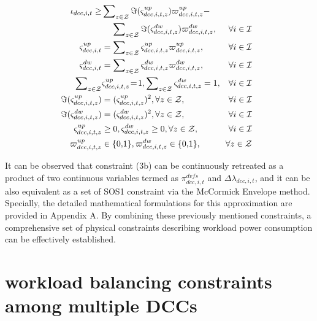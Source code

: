 \documentclass[lettersize,journal]{IEEEtran}
\begin{document}
\vspace{-0.25cm}
\begin{subequations}
\begin{align}
   \!\!\!\!\iota_{dcc,i,t} \geq & \sum\nolimits_{z\in\mathcal{Z}} \Im(\varsigma_{dcc,i,t, z}^{up}) \varpi_{dcc,i,t, z}^{up} - \notag \\
   &\quad\, \sum\nolimits_{z\in\mathcal{Z}} \Im(\varsigma_{dcc,i,t, z}^{dw}) \varpi_{dcc,i,t, z}^{dw}, & \forall i\in \mathcal{I}\\
   \!\!\!\!\varsigma_{dcc,i,t}^{up} & = \sum\nolimits_{z\in\mathcal{Z}} \varsigma_{dcc,i,t,z}^{up} \varpi_{dcc,i,t,z}^{up}, &\forall i\in \mathcal{I}\\
   \!\!\!\!\varsigma_{dcc,i,t}^{dw} & = \sum\nolimits_{z\in\mathcal{Z}} \varsigma_{dcc,i,t,z}^{dw} \varpi_{dcc,i,t,z}^{dw}, & \forall i\in \mathcal{I}\\
   \!\!\!\!\sum\nolimits_{z\in\mathcal{Z}} &\varsigma_{dcc,i,t,z}^{up} \!=\! 1,  \sum\nolimits_{z\in\mathcal{Z}} \varsigma_{dcc,i,t,z}^{dw} = 1,\!\!&\forall i\in \mathcal{I}\\
   \!\!\!\!\Im(\varsigma_{dcc,i,t,z}^{up}) &= (\varsigma_{dcc,i,t,z}^{up})^2,  \forall z\in \mathcal{Z}, &\forall i\in \mathcal{I}\\
   \!\!\!\!\Im(\varsigma_{dcc,i,t,z}^{dw}) &= (\varsigma_{dcc,i,t,z}^{dw})^2,  \forall z\in \mathcal{Z}, &\forall i\in \mathcal{I}\\
   \!\!\!\!\varsigma_{dcc,i,t,z}^{up} &\geq 0,\varsigma_{dcc,i,t,z}^{dw}  \geq 0, \forall z\in \mathcal{Z}, &\forall i\in \mathcal{I}\\
   \!\!\!\!\varpi_{dcc,i,t,z}^{up} &\in\{0,\!1\},\varpi_{dcc,i,t,z}^{dw}\in\{0,\!1\}, & \forall z\in \mathcal{Z}
\end{align}
\end{subequations}

It can be observed that constraint (3b) can be continuously retreated as a product of two continuous variables termed as \(\pi_{dcc,i,t}^{dvfs}\) and \(\varDelta \lambda_{dcc,i,t}\), and it can be also equivalent as a set of SOS1 constraint via the McCormick Envelope method. Specially, the detailed mathematical formulations for this approximation are provided in Appendix A. By combining these previously mentioned constraints, a comprehensive set of physical constraints describing workload power consumption can be effectively established.

\section{workload balancing constraints among multiple DCCs}
\end{document}
